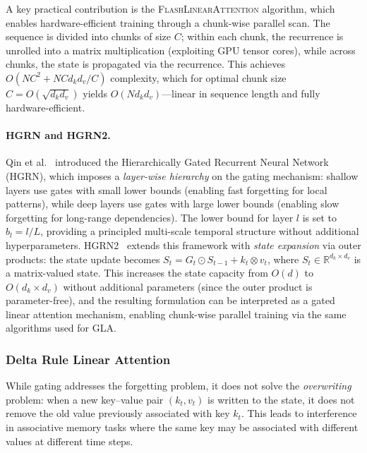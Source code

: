A key practical contribution is the \textsc{FlashLinearAttention} algorithm, which enables hardware-efficient training through a chunk-wise parallel scan. The sequence is divided into chunks of size $C$; within each chunk, the recurrence is unrolled into a matrix multiplication (exploiting GPU tensor cores), while across chunks, the state is propagated via the recurrence. This achieves $O(NC^2 + NC d_k d_v / C)$ complexity, which for optimal chunk size $C = O(\sqrt{d_k d_v})$ yields $O(N d_k d_v)$---linear in sequence length and fully hardware-efficient.

\paragraph{HGRN and HGRN2.}
Qin et al.~\cite{qin2023hgrn} introduced the Hierarchically Gated Recurrent Neural Network (HGRN), which imposes a \emph{layer-wise hierarchy} on the gating mechanism: shallow layers use gates with small lower bounds (enabling fast forgetting for local patterns), while deep layers use gates with large lower bounds (enabling slow forgetting for long-range dependencies). The lower bound for layer $l$ is set to $b_l = l/L$, providing a principled multi-scale temporal structure without additional hyperparameters. HGRN2~\cite{qin2024hgrn2} extends this framework with \emph{state expansion} via outer products: the state update becomes $S_t = G_t \odot S_{t-1} + k_t \otimes v_t$, where $S_t \in \mathbb{R}^{d_k \times d_v}$ is a matrix-valued state. This increases the state capacity from $O(d)$ to $O(d_k \times d_v)$ without additional parameters (since the outer product is parameter-free), and the resulting formulation can be interpreted as a gated linear attention mechanism, enabling chunk-wise parallel training via the same algorithms used for GLA.

\subsubsection{Delta Rule Linear Attention}
\label{subsubsec:delta-linear}

While gating addresses the forgetting problem, it does not solve the \emph{overwriting} problem: when a new key--value pair $(k_t, v_t)$ is written to the state, it does not remove the old value previously associated with key $k_t$. This leads to interference in associative memory tasks where the same key may be associated with different values at different time steps.

